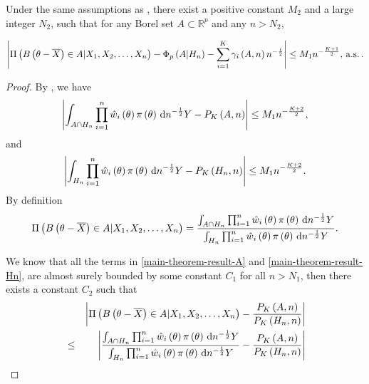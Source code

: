 \begin{thm}
Under the same assumptions as , there exist
a positive constant $M_{2}$ and a large integer $N_{2}$, such that
for any Borel set $A\subset\mathbb{R}^{p}$ and any $n>N_{2}$,%
\begin{comment}
add subscript to constant
\end{comment}
{} 
\begin{equation}
\left|\Pi\left(B\left(\theta-\overline{X}\right)\in A|X_{1},X_{2},\ldots,X_{n}\right)-\Phi_{p}\left(A|H_{n}\right)-\sum_{i=1}^{K}\gamma_{i}\left(A,n\right)n^{-\frac{i}{2}}\right|\le M_{1}n^{-\frac{K+1}{2}},\,\mathrm{a.s.}\,.\label{eq:asym-exp-poster-prob}
\end{equation}

\begin{proof}
By , we have 
\begin{equation}
\left|\int_{A\cap H_{n}}\prod_{i=1}^{n}\hat{w}_{i}\left(\theta\right)\pi\left(\theta\right)\,\mathrm{d} n^{-\frac{1}{2}}Y-P_{K}\left(A,n\right)\right|\le M_{1}n^{-\frac{K+2}{2}},\label{eq:main-theorem-result-A}
\end{equation}
and 
\begin{equation}
\left|\int_{H_{n}}\prod_{i=1}^{n}\hat{w}_{i}\left(\theta\right)\pi\left(\theta\right)\,\mathrm{d} n^{-\frac{1}{2}}Y-P_{K}\left(H_{n},n\right)\right|\le M_{1}n^{-\frac{K+2}{2}}.\label{eq:main-theorem-result-Hn}
\end{equation}
By definition 
\[
\Pi\left(B\left(\theta-\overline{X}\right)\in A|X_{1},X_{2},\ldots,X_{n}\right)=\frac{\int_{A\cap H_{n}}\prod_{i=1}^{n}\hat{w}_{i}\left(\theta\right)\pi\left(\theta\right)\,\mathrm{d} n^{-\frac{1}{2}}Y}{\int_{H_{n}}\prod_{i=1}^{n}\hat{w}_{i}\left(\theta\right)\pi\left(\theta\right)\,\mathrm{d} n^{-\frac{1}{2}}Y}.
\]
\begin{comment}
add more detail in bounded. bounded above and below.
\end{comment}
We know that all the terms in \ref{main-theorem-result-A} and \ref{main-theorem-result-Hn},
are almost surely bounded by some constant $C_{1}$ for all $n>N_{1}$,
then there exists a constant $C_2$ such that
\begin{eqnarray}
 &  & \left|\Pi\left(B\left(\theta-\overline{X}\right)\in A|X_{1},X_{2},\ldots,X_{n}\right)-\frac{P_{K}\left(A,n\right)}{P_{K}\left(H_{n},n\right)}\right|\nonumber \\
 & \le & \left|\frac{\int_{A\cap H_{n}}\prod_{i=1}^{n}\hat{w}_{i}\left(\theta\right)\pi\left(\theta\right)\diff n^{-\frac{1}{2}}Y}{\int_{H_{n}}\prod_{i=1}^{n}\hat{w}_{i}\left(\theta\right)\pi\left(\theta\right)\diff n^{-\frac{1}{2}}Y}-\frac{P_{K}\left(A,n\right)}{P_{K}\left(H_{n},n\right)}\right|\nonumber \\

\end{eqnarray}
\end{proof}
\end{thm}
